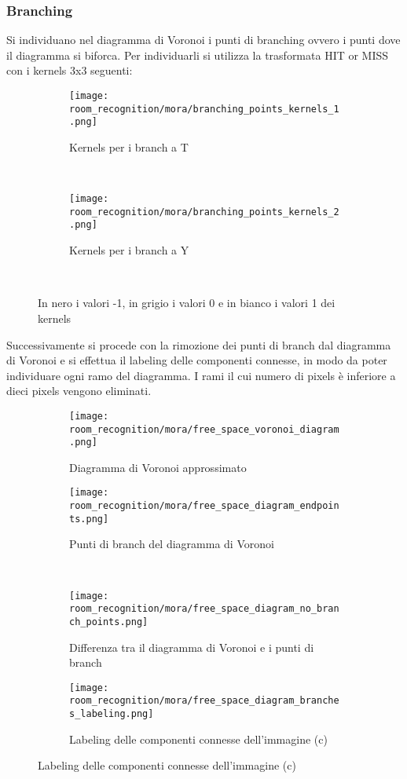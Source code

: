\subsubsection{Branching}
Si individuano nel diagramma di Voronoi i punti di branching ovvero i punti dove il diagramma si biforca. Per individuarli si utilizza la trasformata HIT or MISS con i kernels 3x3 seguenti:
\begin{figure}[H]
  \centering
  \begin{subfigure}[t]{\textwidth}
    \centering
    \texttt{[image: room\_recognition/mora/branching\_points\_kernels\_1.png]}
    \caption{Kernels per i branch a T}
  \end{subfigure}\\
  \begin{subfigure}[t]{\textwidth}
    \centering
    \texttt{[image: room\_recognition/mora/branching\_points\_kernels\_2.png]}
    \caption{Kernels per i branch a Y}
  \end{subfigure}\\
  \caption{In nero i valori -1, in grigio i valori 0 e in bianco i valori 1 dei kernels}
\end{figure}
\noindent
Successivamente si procede con la rimozione dei punti di branch dal diagramma di Voronoi e si effettua il labeling delle componenti connesse, in modo da poter individuare ogni ramo del diagramma. I rami il cui numero di pixels è inferiore a dieci pixels vengono eliminati.
\begin{figure}[H]
  \centering

  \begin{subfigure}[t]{.45\textwidth}
    \centering
    \texttt{[image: room\_recognition/mora/free\_space\_voronoi\_diagram.png]}
    \caption{Diagramma di Voronoi approssimato}
  \end{subfigure}
  \begin{subfigure}[t]{.45\textwidth}
    \centering
    \texttt{[image: room\_recognition/mora/free\_space\_diagram\_endpoints.png]}
    \caption{Punti di branch del diagramma di Voronoi}
  \end{subfigure}\\
  \begin{subfigure}[t]{.45\textwidth}
    \centering
    \texttt{[image: room\_recognition/mora/free\_space\_diagram\_no\_branch\_points.png]}
    \caption{Differenza tra il diagramma di Voronoi e i punti di branch}
  \end{subfigure}
  \begin{subfigure}[t]{.45\textwidth}
    \centering
    \texttt{[image: room\_recognition/mora/free\_space\_diagram\_branches\_labeling.png]}
    \caption{Labeling delle componenti connesse dell'immagine {(c)}}
  \end{subfigure}
\end{figure}

